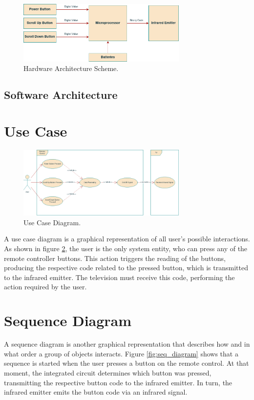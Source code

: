 \documentclass[12pt, letterpaper]{report}
\begin{document}
\begin{figure}[ht]
	\centering
	\includegraphics[width=0.75\textwidth]{HW_Arch}
	\caption{Hardware Architecture Scheme.}
	\label{fig:hw_arch}
\end{figure}

\subsection{Software Architecture}


\section{Use Case}

\begin{figure}[ht]
	\centering
	\includegraphics[width=0.75\textwidth]{Use-Case}
	\caption{Use Case Diagram.}
	\label{fig:use_case}
\end{figure}

A use case diagram is a graphical representation of all user’s possible interactions. As shown in figure \ref{fig:use_case}, the user is the only system entity, who can press any of the remote controller buttons. This action triggers the reading of the buttons, producing the respective code related to the pressed button, which is transmitted to the infrared emitter. The television must receive this code, performing the action required by the user.

\section{Sequence Diagram}
A sequence diagram is another graphical representation that describes how and in what order a group of objects interacts. Figure \ref{fig:seq_diagram} shows that a sequence is started when the user presses a button on the remote control. At that moment, the integrated circuit determines which button was pressed, transmitting the respective button code to the infrared emitter. In turn, the infrared emitter emits the button code via an infrared signal.
\end{document}
